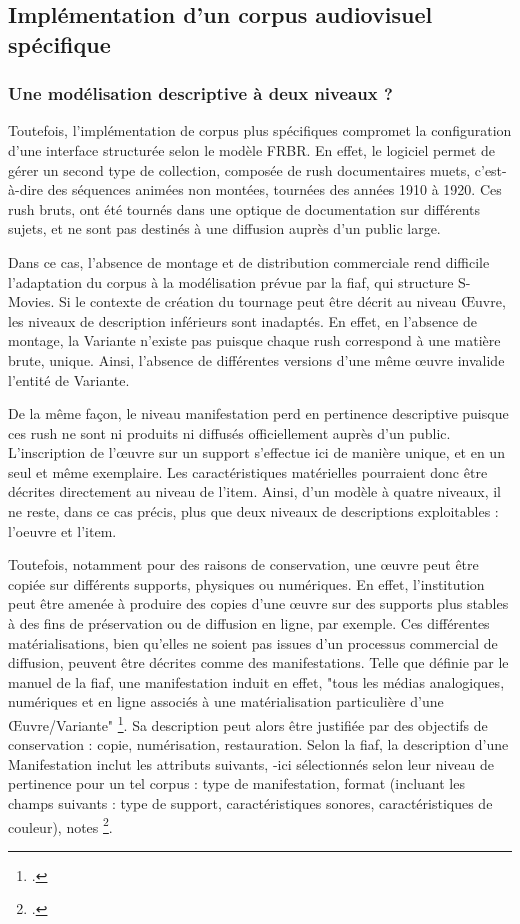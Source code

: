 \subsection{Implémentation d'un corpus audiovisuel spécifique}
\subsubsection{Une modélisation descriptive à deux niveaux ?}

Toutefois, l'implémentation de corpus plus spécifiques compromet la configuration d'une interface structurée selon le modèle \gls{FRBR}. En effet, le logiciel permet de gérer un second type de collection, composée de \gls{rush} documentaires muets, c'est-à-dire des séquences animées non montées, tournées des années 1910 à 1920. Ces \gls{rush} bruts, ont été tournés dans une optique de documentation sur différents sujets, et ne sont pas destinés à une diffusion auprès d'un public large. 

Dans ce cas, l'absence de montage et de distribution commerciale rend difficile l'adaptation du corpus à la modélisation prévue par la \gls{fiaf}, qui structure S-Movies. Si le contexte de création du tournage peut être décrit au niveau Œuvre, les niveaux de description inférieurs sont inadaptés. En effet, en l'absence de montage, la Variante n'existe pas puisque chaque \gls{rush} correspond à une matière brute, unique. Ainsi, l'absence de différentes versions d'une même œuvre invalide l'entité de Variante.  

De la même façon, le niveau \gls{manifestation} perd en pertinence descriptive puisque ces \gls{rush} ne sont ni produits ni diffusés officiellement auprès d'un public. L'inscription de l'œuvre sur un support s'effectue ici de manière unique, et en un seul et même exemplaire. Les caractéristiques matérielles pourraient donc être décrites directement au niveau de l'\gls{item}.  Ainsi, d'un modèle à quatre niveaux, il ne reste, dans ce cas précis, plus que deux niveaux de descriptions exploitables : l’\gls{oeuvre} et l’\gls{item}. 

Toutefois, notamment pour des raisons de conservation, une œuvre peut être copiée sur différents supports, physiques ou numériques. En effet, l'institution peut être amenée à produire des copies d’une œuvre sur des supports plus stables à des fins de préservation ou de diffusion en ligne, par exemple. Ces différentes matérialisations, bien qu'elles ne soient pas issues d'un processus commercial de diffusion, peuvent être décrites comme des \gls{manifestation}s. Telle que définie par le manuel de la \gls{fiaf}, une manifestation induit en effet, "tous les médias analogiques, numériques et en ligne associés à une matérialisation particulière d'une Œuvre/Variante" \footcite{zotero-item-646}. Sa description peut alors être justifiée par des objectifs de conservation : copie, numérisation, restauration. Selon la \gls{fiaf}, la description d'une Manifestation inclut les attributs suivants, -ici sélectionnés selon leur niveau de pertinence pour un tel corpus : type de manifestation, format (incluant les champs suivants : type de support, caractéristiques sonores, caractéristiques de couleur), notes \footcite{zotero-item-646}. 

